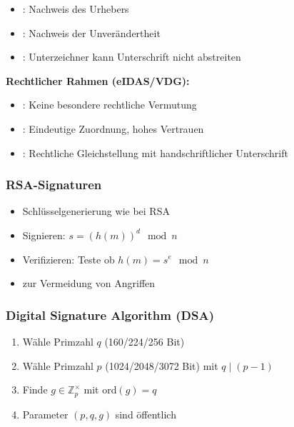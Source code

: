 \documentclass[
../../css_summary.tex,
]
{subfiles}
\begin{document}
\begin{defbox}
   \begin{itemize}
      \item {}: Nachweis des Urhebers
      \item {}: Nachweis der Unverändertheit
      \item {}: Unterzeichner kann Unterschrift nicht abstreiten
   \end{itemize}
\end{defbox}

\noindent\textbf{Rechtlicher Rahmen (eIDAS/VDG):}
\begin{itemize}
   \item {}: Keine besondere rechtliche Vermutung
   \item {}: Eindeutige Zuordnung, hohes Vertrauen
   \item {}: Rechtliche Gleichstellung mit handschriftlicher Unterschrift
\end{itemize}

\subsubsection{RSA-Signaturen}

\begin{defbox}
   \begin{itemize}
      \item Schlüsselgenerierung wie bei RSA
      \item Signieren: $s = (h(m))^d \mod n$
      \item Verifizieren: Teste ob $h(m) = s^e \mod n$
      \item {} zur Vermeidung von Angriffen
   \end{itemize}
\end{defbox}

\subsubsection*{Digital Signature Algorithm (DSA)}

\begin{defbox}
   \begin{enumerate}
      \item Wähle Primzahl $q$ (160/224/256 Bit)
      \item Wähle Primzahl $p$ (1024/2048/3072 Bit) mit $q \mid (p-1)$
      \item Finde $g \in \mathbb{Z}_p^\times$ mit $\text{ord}(g) = q$
      \item Parameter $(p, q, g)$ sind öffentlich
   \end{enumerate}
\end{defbox}
\end{document}
